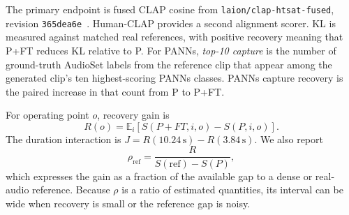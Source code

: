 \documentclass{article}
\newcommand{\PFT}{P{+}FT}
\begin{document}
The primary endpoint is fused CLAP cosine from \texttt{laion/\allowbreak clap-htsat-fused}, revision \texttt{365dea6e}~\cite{wu2023clap}. Human-CLAP provides a second alignment scorer. KL is measured against matched real references, with positive recovery meaning that \PFT{} reduces KL relative to P. For PANNs, \emph{top-10 capture} is the number of ground-truth AudioSet labels from the reference clip that appear among the generated clip's ten highest-scoring PANNs classes. PANNs capture recovery is the paired increase in that count from P to \PFT{}.

For operating point $o$, recovery gain is
\begin{equation}
R(o)=\mathbb{E}_{i}\left[S(\PFT,i,o)-S(P,i,o)\right].
\end{equation}
The duration interaction is $J=R(10.24\,\mathrm{s})-R(3.84\,\mathrm{s})$. We also report
\begin{equation}
\rho_{\mathrm{ref}}=\frac{R}{S(\mathrm{ref})-S(P)},
\end{equation}
which expresses the gain as a fraction of the available gap to a dense or real-audio reference. Because $\rho$ is a ratio of estimated quantities, its interval can be wide when recovery is small or the reference gap is noisy.
\end{document}
